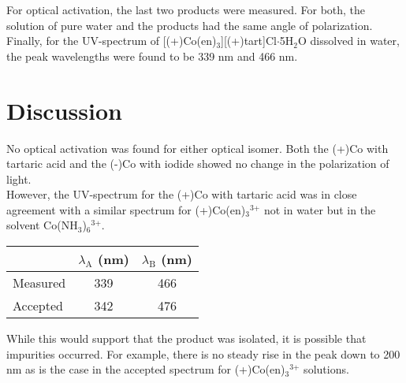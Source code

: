 \documentclass[11pt]{article}
\newcommand{\super}[1]{\ensuremath{^{\textrm{#1}}}}
\newcommand{\sub}[1]{\ensuremath{_{\textrm{#1}}}}
\begin{document}
For optical activation, the last two products were measured. For both, the solution of pure water and the products had the same angle of polarization. \\

Finally, for the UV-spectrum of [(+)Co(en)\sub{3}][(+)tart]Cl$\cdot$5H\sub{2}O dissolved in water, the peak wavelengths were found to be 339 nm and 466 nm.


\section{Discussion}
No optical activation was found for either optical isomer. Both the (+)Co with tartaric acid and the (-)Co with iodide showed no change in the polarization of light. \\

However, the UV-spectrum for the (+)Co with tartaric acid was in close agreement with a similar spectrum for (+)Co(en)\sub{3}\super{3+} not in water but in the solvent Co(NH\sub{3})\sub{6}\super{3+}.\cite{spectrum}

\begin{center}
\begin{tabular}{|l|c|c|}
\hline
\textbf{} & \textbf{$\lambda$\sub{A} (nm)} & \textbf{$\lambda$\sub{B} (nm)} \\
\hline
Measured & 339 & 466 \\
Accepted\cite{spectrum} & 342 & 476 \\
\hline
\end{tabular}
\end{center}

While this would support that the product was isolated, it is possible that impurities occurred. For example, there is no steady rise in the peak down to 200 nm as is the case in the accepted spectrum for (+)Co(en)\sub{3}\super{3+} solutions.\cite{spectrum}




\raggedright




\end{document}
